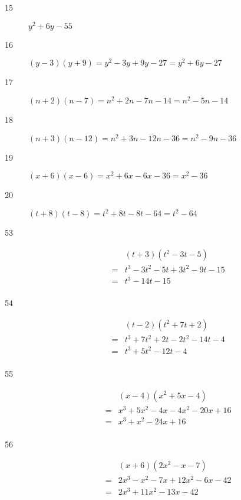 \documentclass[letterpaper, landscape]{exam}
\begin{document}
    \begin{description}
      \item[15] $y^2 + 6y - 55$

      \item[16]
      \( (y - 3)(y + 9) = y^2 - 3y + 9y - 27 = y^2 + 6y - 27 \)

      \item[17]
      \( (n + 2)(n - 7) = n^2 + 2n - 7n - 14 = n^2 - 5n - 14 \)

      \item[18]
      \( (n + 3)(n - 12) = n^2 + 3n - 12n - 36 = n^2 - 9n - 36 \)

      \item[19]
      \( (x + 6)(x - 6) = x^2 + 6x - 6x - 36 = x^2 - 36 \)

      \item[20]
      \( (t + 8)(t - 8) = t^2 + 8t - 8t - 64 = t^2 - 64 \)

      \item[53]
      \begin{eqnarray*}
        && (t + 3)(t^2 - 3t - 5) \\
        &=& t^3 - 3t^2 - 5t + 3t^2 - 9t - 15 \\
        &=& t^3 - 14t - 15 \\
      \end{eqnarray*}

      \item[54]
      \begin{eqnarray*}
        && (t - 2)(t^2 + 7t + 2) \\
        &=& t^3 + 7t^2 + 2t - 2t^2 - 14t - 4 \\
        &=& t^3 + 5t^2 - 12t - 4 \\
      \end{eqnarray*}

      \item[55]
      \begin{eqnarray*}
        && (x - 4)(x^2 + 5x -4) \\
        &=& x^3 + 5x^2 - 4x - 4x^2 - 20x + 16 \\
        &=& x^3 + x^2 - 24x + 16 \\
      \end{eqnarray*}

      \item[56]
      \begin{eqnarray*}
        && (x+6)(2x^2 - x - 7) \\
        &=& 2x^3 - x^2 - 7x + 12x^2 - 6x - 42 \\
        &=& 2x^3 + 11x^2 - 13x - 42 \\
      \end{eqnarray*}


\end{description}
\end{document}
